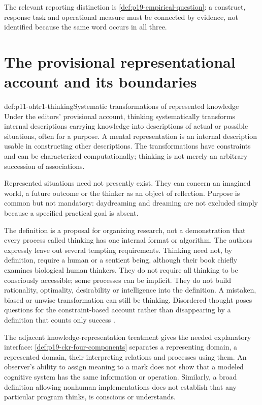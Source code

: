The relevant reporting distinction is \cref{def:p19-empirical-question}:
a construct, response task and operational measure must be connected by
evidence, not identified because the same word occurs in all three.
\parencite[pp.~1--2, fig.~1.1]{HolyoakMorrison2012ReadersGuide}

\section{The provisional representational account and its boundaries}
\label{sec:p11-ohtr1-definition}

\begin{hbdefinition}{def:p11-ohtr1-thinking}{Systematic transformations of represented knowledge}
Under the editors' provisional account, thinking systematically transforms
internal descriptions carrying knowledge into descriptions of actual or
possible situations, often for a purpose. A mental representation is an
internal description usable in constructing other descriptions. The
transformations have constraints and can be characterized computationally;
thinking is not merely an arbitrary succession of associations.

Represented situations need not presently exist. They can concern an
imagined world, a future outcome or the thinker as an object of reflection.
Purpose is common but not mandatory: daydreaming and dreaming are not
excluded simply because a specified practical goal is absent.
\end{hbdefinition}

The definition is a proposal for organizing research, not a demonstration
that every process called thinking has one internal format or algorithm.
The authors expressly leave out several tempting requirements. Thinking
need not, by definition, require a human or a sentient being, although their
book chiefly examines biological human thinkers. They do not require all
thinking to be consciously accessible; some processes can be implicit.
They do not build rationality, optimality, desirability or intelligence into
the definition. A mistaken, biased or unwise transformation can still be
thinking. Disordered thought poses questions for the constraint-based account
rather than disappearing by a definition that counts only success
\parencite[pp.~1--2]{HolyoakMorrison2012ReadersGuide}.

The adjacent knowledge-representation treatment gives the needed explanatory
interface: \cref{def:p19-ckr-four-components} separates a representing
domain, a represented domain, their interpreting relations and processes
using them. An observer's ability to assign meaning to a mark does not show
that a modeled cognitive system has the same information or operation.
Similarly, a broad definition allowing nonhuman implementations does not
establish that any particular program thinks, is conscious or understands.

